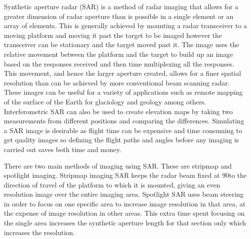 Synthetic aperture radar (SAR) is a method of radar imaging that allows for a greater dimension of radar aperture than is possible in a single element or an array of elements. This is generally achieved by mounting a radar transceiver to a moving platform and moving it past the target to be imaged however the transceiver can be stationary and the target moved past it. The image uses the relative movement between the platform and the target to build up an image based on the responses received and then time multiplexing all the responses. This movement, and hence the larger aperture created, allows for a finer spatial resolution than can be achieved by more conventional beam scanning radar. These images can be useful for a variety of applications such as remote mapping of the surface of the Earth for glaciology and geology among others. Interferometric SAR can also be used to create elevation maps by taking two measurements from different positions and comparing the differences.
Simulating a SAR image is desirable as flight time can be expensive and time consuming to get quality images so defining the flight paths and angles before any imaging is carried out saves both time and money. \par
There are two main methods of imaging using SAR. These are stripmap and spotlight imaging. Stripmap imaging SAR keeps the radar beam fixed at 90\degree to the direction of travel of the platform to which it is mounted, giving an even resolution image over the entire imaging area. Spotlight SAR uses beam steering in order to focus on one specific area to increase image resolution in that area, at the expense of image resolution in other areas. This extra time spent focusing on the single area increases the synthetic aperture length for that section only which increases the resolution.

